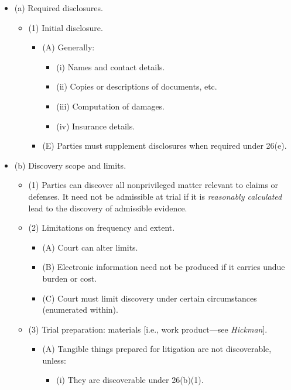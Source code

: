 \begin{itemize}
    \item (a) Required disclosures.
    \begin{itemize}
        \item (1) Initial disclosure.
        \begin{itemize}
            \item (A) Generally:
            \begin{itemize}
                \item (i) Names and contact details.
                \item (ii) Copies or descriptions of documents, etc.
                \item (iii) Computation of damages.
                \item (iv) Insurance details.
            \end{itemize}
            \item (E) Parties must supplement disclosures when required under 26(e).
        \end{itemize}
    \end{itemize}
    \item (b) Discovery scope and limits.
    \begin{itemize}
        \item (1) Parties can discover all nonprivileged matter relevant to claims or defenses. It need not be admissible at trial if it is \emph{reasonably calculated} lead to the discovery of admissible evidence.
        \item (2) Limitations on frequency and extent.
        \begin{itemize}
            \item (A) Court can alter limits.
            \item (B) Electronic information need not be produced if it carries undue burden or cost.
            \item (C) Court must limit discovery under certain circumstances (enumerated within).
        \end{itemize}
        \item (3) Trial preparation: materials [i.e., work product---see \emph{Hickman}].
        \begin{itemize}
            \item (A) Tangible things prepared for litigation are not discoverable, unless:
            \begin{itemize}
                \item (i) They are discoverable under 26(b)(1).

\end{itemize}
\end{itemize}
\end{itemize}
\end{itemize}
